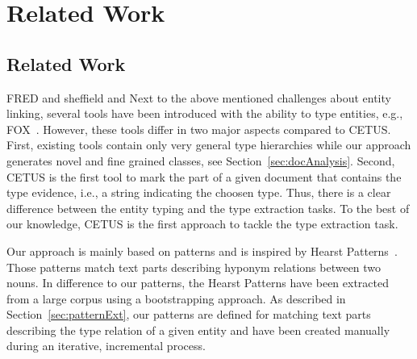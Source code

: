 \chapter{Related Work}



\section{Related Work}

\cite{oak_sheffield,fred_typing} FRED and sheffield and \cite{okechallenge}
Next to the above mentioned challenges about entity linking, several tools have been introduced with the ability to type entities, e.g., FOX~\cite{FOX}.
However, these tools differ in two major aspects compared to CETUS.
First, existing tools contain only very general type hierarchies while our approach generates novel and fine grained classes, see Section~\ref{sec:docAnalysis}.
Second, CETUS is the first tool to mark the part of a given document that contains the type evidence, i.e., a string indicating the choosen type.
Thus, there is a clear difference between the entity typing and the type extraction tasks.
To the best of our knowledge, CETUS is the first approach to tackle the type extraction task.

Our approach is mainly based on patterns and is inspired by  Hearst Patterns~\cite{Hearst1992}.
Those patterns match text parts describing hyponym relations between two nouns.
In difference to our patterns, the Hearst Patterns have been extracted from a large corpus using a bootstrapping approach.
As described in Section~\ref{sec:patternExt}, our patterns are defined for matching text parts describing the type relation of a given entity and have been created manually during an iterative, incremental process.



